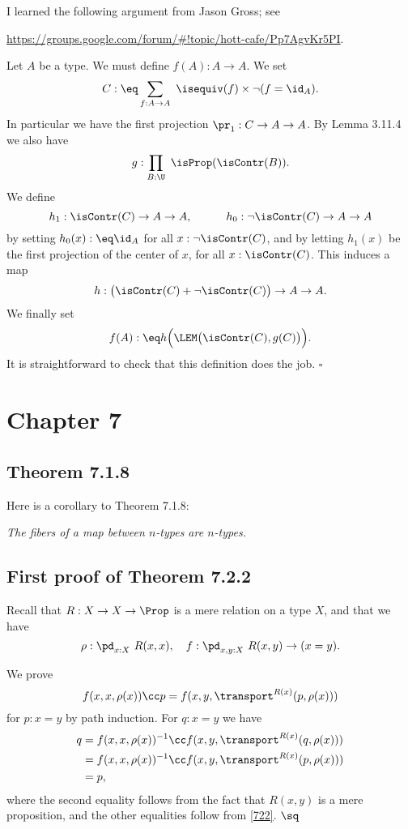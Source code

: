 \documentclass[12pt]{article}
\begin{document}
I learned the following argument from Jason Gross; see 

\nn\href{https://groups.google.com/forum/#!topic/hott-cafe/Pp7AgvKr5PI}{https://groups.google.com/forum/\#!topic/hott-cafe/Pp7AgvKr5PI}.

Let $A$ be a type. We must define $f(A):A\to A$. We set 
$$
C:\eq\sum_{f:A\to A}\ \isequiv(f)\times\neg(f=\id_A).
$$ 
In particular we have the first projection $\pr_1:C\to A\to A$. By Lemma 3.11.4 we also have 
$$
g:\prod_{B:\U}\ \isProp(\isContr(B)).
$$ 
We define 
$$
h_1:\isContr(C)\to A\to A,\qquad\quad h_0:\neg\isContr(C)\to A\to A
$$ 
by setting $h_0(x):\eq\id_A$ for all $x:\neg\isContr(C)$, and by letting $h_1(x)$ be the first projection of the center of $x$, for all $x:\isContr(C)$. This induces a map 
$$
h:\big(\isContr(C)+\neg\isContr(C)\big)\to A\to A.
$$ 
We finally set 
$$
f(A):\eq h\Big(\LEM\big(\isContr(C),g(C)\big)\Big).
$$
It is straightforward to check that this definition does the job. $\square$


\section{Chapter 7}

\subsection{Theorem 7.1.8}\label{718}

Here is a corollary to Theorem 7.1.8: 

\emph{The fibers of a map between $n$-types are $n$-types.}


\subsection{First proof of Theorem 7.2.2}

Recall that $R:X\to X\to\Prop$ is a mere relation on a type $X$, and that we have 
$$
\rho:\pd_{x:X}\ R(x,x),\quad f:\pd_{x,y:X}\ R(x,y)\to(x=y).
$$ 

We prove 
\begin{equation}\label{722}
f(x,x,\rho(x))\cc p=f(x,y,\transport^{R(x)}(p,\rho(x)))
\end{equation}  
for $p:x=y$ by path induction. For $q:x=y$ we have 
\begin{align*}
q&=f(x,x,\rho(x))^{-1}\cc f(x,y,\transport^{R(x)}(q,\rho(x)))\\
&=f(x,x,\rho(x))^{-1}\cc f(x,y,\transport^{R(x)}(p,\rho(x)))\\
&=p,
\end{align*} 
where the second equality follows from the fact that $R(x,y)$ is a mere proposition, and the other equalities follow from \eqref{722}. $\sq$
\end{document}
